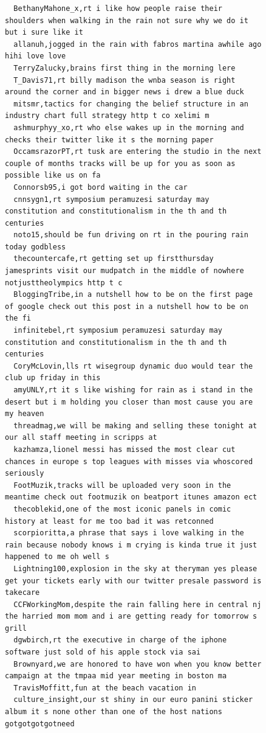 \begin{figure}[htpb]
\begin{verbatim}
  BethanyMahone_x,rt i like how people raise their shoulders when walking in the rain not sure why we do it but i sure like it
  allanuh,jogged in the rain with fabros martina awhile ago hihi love love
  TerryZalucky,brains first thing in the morning lere
  T_Davis71,rt billy madison the wnba season is right around the corner and in bigger news i drew a blue duck
  mitsmr,tactics for changing the belief structure in an industry chart full strategy http t co xelimi m
  ashmurphyy_xo,rt who else wakes up in the morning and checks their twitter like it s the morning paper
  OccamsrazorPT,rt tusk are entering the studio in the next couple of months tracks will be up for you as soon as possible like us on fa
  Connorsb95,i got bord waiting in the car
  cnnsygn1,rt symposium peramuzesi saturday may constitution and constitutionalism in the th and th centuries
  noto15,should be fun driving on rt in the pouring rain today godbless
  thecountercafe,rt getting set up firstthursday jamesprints visit our mudpatch in the middle of nowhere notjusttheolympics http t c
  BloggingTribe,in a nutshell how to be on the first page of google check out this post in a nutshell how to be on the fi
  infinitebel,rt symposium peramuzesi saturday may constitution and constitutionalism in the th and th centuries
  CoryMcLovin,lls rt wisegroup dynamic duo would tear the club up friday in this
  amyUNLY,rt it s like wishing for rain as i stand in the desert but i m holding you closer than most cause you are my heaven
  threadmag,we will be making and selling these tonight at our all staff meeting in scripps at
  kazhamza,lionel messi has missed the most clear cut chances in europe s top leagues with misses via whoscored seriously
  FootMuzik,tracks will be uploaded very soon in the meantime check out footmuzik on beatport itunes amazon ect
  thecoblekid,one of the most iconic panels in comic history at least for me too bad it was retconned
  scorpioritta,a phrase that says i love walking in the rain because nobody knows i m crying is kinda true it just happened to me oh well s
  Lightning100,explosion in the sky at theryman yes please get your tickets early with our twitter presale password is takecare
  CCFWorkingMom,despite the rain falling here in central nj the harried mom mom and i are getting ready for tomorrow s grill
  dgwbirch,rt the executive in charge of the iphone software just sold of his apple stock via sai
  Brownyard,we are honored to have won when you know better campaign at the tmpaa mid year meeting in boston ma
  TravisMoffitt,fun at the beach vacation in
  culture_insight,our st shiny in our euro panini sticker album it s none other than one of the host nations gotgotgotgotneed

\end{verbatim}
\end{figure}
